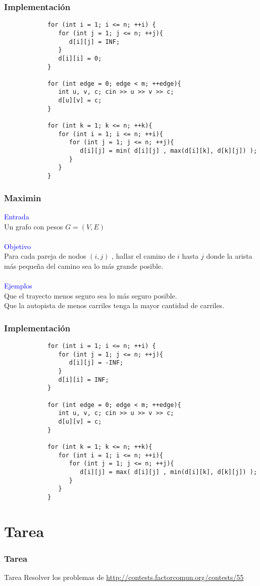 \documentclass{beamer}
\begin{document}
	\begin{frame}[fragile]
		\frametitle{Implementación}
		\begin{lstlisting}
			for (int i = 1; i <= n; ++i) {
			   for (int j = 1; j <= n; ++j){
			      d[i][j] = INF;
			   }
			   d[i][i] = 0;
			}

			for (int edge = 0; edge < m; ++edge){
			   int u, v, c; cin >> u >> v >> c;
			   d[u][v] = c;
			}
			
			for (int k = 1; k <= n; ++k){
			   for (int i = 1; i <= n; ++i){
			      for (int j = 1; j <= n; ++j){
			         d[i][j] = min( d[i][j] , max(d[i][k], d[k][j]) );
			      }
			   }
			}
		\end{lstlisting}
	\end{frame}
	
	\begin{frame}
		\frametitle{Maximin}
		\textcolor{blue}{\large Entrada}\\
		Un grafo con pesos $G = (V, E)$ \\ \quad \\
		\textcolor{blue}{\large Objetivo}\\
		Para cada pareja de nodos $(i, j)$ , hallar el camino de $i$ hasta $j$ donde la arista más pequeña del camino sea lo más grande posible.\\ \quad \\
		\textcolor{blue}{\large Ejemplos}\\
		Que el trayecto menos seguro sea lo más seguro posible.\\
		Que la autopista de menos carriles tenga la mayor cantidad de carriles.
	\end{frame}
	
	
	\begin{frame}[fragile]
		\frametitle{Implementación}
		\begin{lstlisting}
			for (int i = 1; i <= n; ++i) {
			   for (int j = 1; j <= n; ++j){
			      d[i][j] = -INF;
			   }
			   d[i][i] = INF;
			}

			for (int edge = 0; edge < m; ++edge){
			   int u, v, c; cin >> u >> v >> c;
			   d[u][v] = c;
			}
			
			for (int k = 1; k <= n; ++k){
			   for (int i = 1; i <= n; ++i){
			      for (int j = 1; j <= n; ++j){
			         d[i][j] = max( d[i][j] , min(d[i][k], d[k][j]) );
			      }
			   }
			}
		\end{lstlisting}
	\end{frame}
	
	\section{Tarea}
		\begin{frame}[fragile]
			\frametitle{Tarea}
			\begin{alertblock}{Tarea}
				Resolver los problemas de \url{http://contests.factorcomun.org/contests/55}
			\end{alertblock}
		\end{frame}
\end{document}
